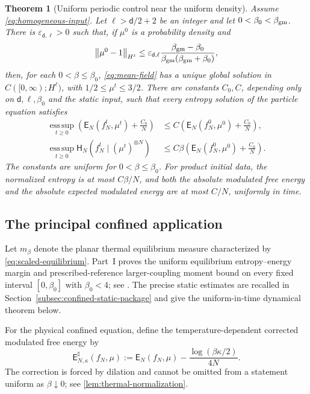 \documentclass[11pt,reqno]{amsart}
\numberwithin{equation}{section}
\newtheorem{theorem}{Theorem}[section]
\theoremstyle{definition}
\theoremstyle{remark}
\renewcommand{\d}{\mathsf d}
\newcommand{\Hr}{\mathsf H}
\newcommand{\Er}{\mathsf E}
\newcommand{\esssup}{\operatorname*{ess\,sup}}
\newcommand{\norm}[1]{\left\lVert#1\right\rVert}
\begin{document}
\begin{theorem}[Uniform periodic control near the uniform density]\label{thm:periodic-uniform}
Assume \eqref{eq:homogeneous-input}. Let $\ell>\d/2+2$ be an integer and let $0<\beta_0<\beta_{\rm gm}$. There is $\varepsilon_{\d,\ell}>0$ such that, if $\mu^0$ is a probability density and
\begin{equation}\label{eq:periodic-radius}
 \norm{\mu^0-1}_{H^\ell}
 \leq\varepsilon_{\d,\ell}
       \frac{\beta_{\rm gm}-\beta_0}
       {\beta_{\rm gm}(\beta_{\rm gm}+\beta_0)},
\end{equation}
then, for each $0<\beta\leq\beta_0$, \eqref{eq:mean-field} has a unique global solution in $C([0,\infty);H^\ell)$, with $1/2\leq\mu^t\leq3/2$. There are constants $C_0,C$, depending only on $\d,\ell,\beta_0$ and the static input, such that every entropy solution of the particle equation satisfies
\begin{align}
 \esssup_{t\geq0}\left(\Er_N(f_N^t,\mu^t)+\frac{C_0}{N}\right)
 &\leq C\left(\Er_N(f_N^0,\mu^0)+\frac{C_0}{N}\right),
 \label{eq:periodic-uniform-energy}\\
 \esssup_{t\geq0}\Hr_N(f_N^t\mid(\mu^t)^{\otimes N})
 &\leq C\beta\left(\Er_N(f_N^0,\mu^0)+\frac{C_0}{N}\right).
 \label{eq:periodic-uniform-entropy}
\end{align}
The constants are uniform for $0<\beta\leq\beta_0$. For product initial data, the normalized entropy is at most $C\beta/N$, and both the absolute modulated free energy and the absolute expected modulated energy are at most $C/N$, uniformly in time.
\end{theorem}


\begingroup\ifdefined\MarkedRevision\color{red}\fi
\subsection{The principal confined application}

Let $m_\beta$ denote the planar thermal equilibrium measure characterized by \eqref{eq:scaled-equilibrium}. Part~I proves the uniform equilibrium entropy--energy margin and prescribed-reference larger-coupling moment bound on every fixed interval $[0,\beta_0]$ with $\beta_0<4$; see \cite[Theorem~9.1 and Appendix~G]{PartI}. The precise static estimates are recalled in Section~\ref{subsec:confined-static-package} and give the uniform-in-time dynamical theorem below.

For the physical confined equation, define the temperature-dependent corrected modulated free energy by
\begin{equation}\label{eq:corrected-physical-energy}
 \Er_{N,\kappa}^{\sharp}(f_N,\mu)
 :=\Er_N(f_N,\mu)-\frac{\log(\beta\kappa/2)}{4N}.
\end{equation}
The correction is forced by dilation and cannot be omitted from a statement uniform as $\beta\downarrow0$; see \cref{lem:thermal-normalization}.
\end{document}
